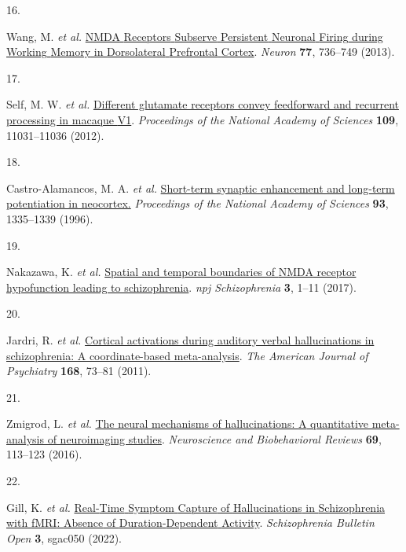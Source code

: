 \documentclass[
]{article}
\newlength{\cslhangindent}
\newlength{\csllabelwidth}
\newenvironment{CSLReferences}[2] %
 {\begin{list}{}{%
  \setlength{\itemindent}{0pt}
  \setlength{\leftmargin}{0pt}
  \setlength{\parsep}{0pt}
  \ifodd #1
   \setlength{\leftmargin}{\cslhangindent}
   \setlength{\itemindent}{-1\cslhangindent}
  \fi
  \setlength{\itemsep}{#2\baselineskip}}}
 {\end{list}}
\newcommand{\CSLLeftMargin}[1]{\parbox[t]{\csllabelwidth}{\strut#1\strut}}
\newcommand{\CSLRightInline}[1]{\parbox[t]{\linewidth - \csllabelwidth}{\strut#1\strut}}
\begin{document}
\begin{CSLReferences}{0}{0}
\CSLLeftMargin{16. }%
\CSLRightInline{Wang, M. \emph{et al.}
\href{https://doi.org/10.1016/j.neuron.2012.12.032}{{NMDA} {Receptors}
{Subserve} {Persistent} {Neuronal} {Firing} during {Working} {Memory} in
{Dorsolateral} {Prefrontal} {Cortex}}. \emph{Neuron} \textbf{77},
736--749 (2013).}

\CSLLeftMargin{17. }%
\CSLRightInline{Self, M. W. \emph{et al.}
\href{https://doi.org/10.1073/pnas.1119527109}{Different glutamate
receptors convey feedforward and recurrent processing in macaque {V1}}.
\emph{Proceedings of the National Academy of Sciences} \textbf{109},
11031--11036 (2012).}

\CSLLeftMargin{18. }%
\CSLRightInline{Castro-Alamancos, M. A. \emph{et al.}
\href{https://doi.org/10.1073/pnas.93.3.1335}{Short-term synaptic
enhancement and long-term potentiation in neocortex.} \emph{Proceedings
of the National Academy of Sciences} \textbf{93}, 1335--1339 (1996).}

\CSLLeftMargin{19. }%
\CSLRightInline{Nakazawa, K. \emph{et al.}
\href{https://doi.org/10.1038/s41537-016-0003-3}{Spatial and temporal
boundaries of {NMDA} receptor hypofunction leading to schizophrenia}.
\emph{npj Schizophrenia} \textbf{3}, 1--11 (2017).}

\CSLLeftMargin{20. }%
\CSLRightInline{Jardri, R. \emph{et al.}
\href{https://doi.org/10.1176/appi.ajp.2010.09101522}{Cortical
activations during auditory verbal hallucinations in schizophrenia: A
coordinate-based meta-analysis}. \emph{The American Journal of
Psychiatry} \textbf{168}, 73--81 (2011).}

\CSLLeftMargin{21. }%
\CSLRightInline{Zmigrod, L. \emph{et al.}
\href{https://doi.org/10.1016/j.neubiorev.2016.05.037}{The neural
mechanisms of hallucinations: {A} quantitative meta-analysis of
neuroimaging studies}. \emph{Neuroscience and Biobehavioral Reviews}
\textbf{69}, 113--123 (2016).}

\CSLLeftMargin{22. }%
\CSLRightInline{Gill, K. \emph{et al.}
\href{https://doi.org/10.1093/schizbullopen/sgac050}{Real-{Time}
{Symptom} {Capture} of {Hallucinations} in {Schizophrenia} with {fMRI}:
{Absence} of {Duration}-{Dependent} {Activity}}. \emph{Schizophrenia
Bulletin Open} \textbf{3}, sgac050 (2022).}


\end{CSLReferences}
\end{document}
